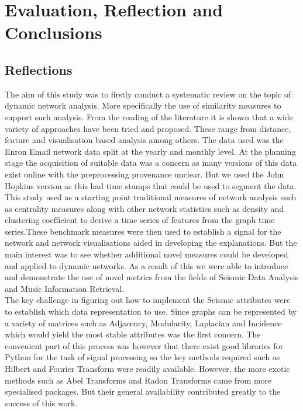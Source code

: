 \chapter{Evaluation, Reflection and Conclusions}

\section{Reflections}

The aim of this study was to firstly conduct a systematic review on the topic of dynamic network analysis. More specifically the use of similarity measures to support such analysis. From the reading of the literature it is shown that a wide variety of approaches have been tried and proposed. These range from distance, feature and visualisation based analysis among others. The data used was the Enron Email network data split at the yearly and monthly level. At the planning stage the acquisition of suitable data was a concern as many versions of this data exist online with the preprocessing provenance unclear. But we used the John Hopkins version as this had time stamps that could be used to segment the data. \\

This study used as a starting point traditional measures of network analysis such as centrality measures along with other network statistics such as density and clustering coefficient to derive a time series of features from the graph time series.These benchmark measures were then used to establish a signal for the network and network visualisations aided in developing the explanations. But the main interest was to see whether additional novel measures could be developed and applied to dynamic networks. As a result of this we were able to introduce and demonstrate the use of novel metrics from the fields of Seismic Data Analysis and Music Information Retrieval. \\

The key challenge in figuring out how to implement the Seismic attributes were to establish which data representation to use. Since graphs can be represented by a variety of matrices such as Adjacency, Modularity, Laplacian and Incidence which would yield the most stable attributes was the first concern. The convenient part of this process was however that there exist good libraries for Python for the task of signal processing so the key methods required such as Hilbert and Fourier Transform were readily available. However, the more exotic methods such as Abel Transforms and Radon Transforms came from more specialised packages. But their general availability contributed greatly to the success of this work. \\


